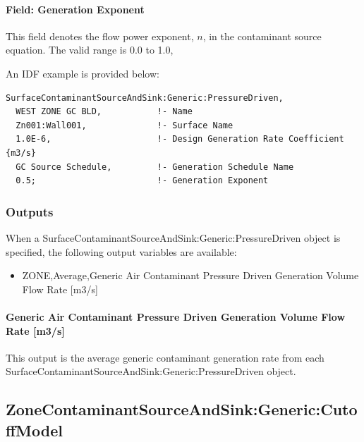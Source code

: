 \paragraph{Field: Generation Exponent}\label{field-generation-exponent}

This field denotes the flow power exponent, $n$, in the contaminant source equation. The valid range is 0.0 to 1.0,

An IDF example is provided below:

\begin{lstlisting}
SurfaceContaminantSourceAndSink:Generic:PressureDriven,
  WEST ZONE GC BLD,           !- Name
  Zn001:Wall001,              !- Surface Name
  1.0E-6,                     !- Design Generation Rate Coefficient {m3/s}
  GC Source Schedule,         !- Generation Schedule Name
  0.5;                        !- Generation Exponent
\end{lstlisting}

\subsubsection{Outputs}\label{outputs-8-003}

When a Surface\-Contaminant\-Source\-And\-Sink:\-Generic:\-Pressure\-Driven object is specified, the following output variables are available:

\begin{itemize}
  \tightlist
  \item
    ZONE,Average,Generic Air Contaminant Pressure Driven Generation Volume Flow Rate {[}m3/s{]}
\end{itemize}

\paragraph{Generic Air Contaminant Pressure Driven Generation Volume Flow Rate {[}m3/s{]}}\label{generic-air-contaminant-pressure-driven-generation-volume-flow-rate-m3s}

This output is the average generic contaminant generation rate from each Surface\-Contaminant\-Source\-And\-Sink:\-Generic:\-Pressure\-Driven object.

\subsection{ZoneContaminantSourceAndSink:Generic:CutoffModel}\label{zonecontaminantsourceandsinkgenericcutoffmodel}

